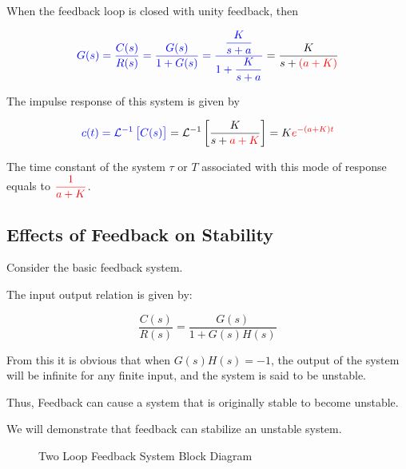 \documentclass[
  14pt,
  a4paper,
  oneside,
  open=any,
  a4paper,
  14pt]{report}
\begin{document}
When the feedback loop is closed with unity feedback, then

\[
    \textcolor{blue}{G(s) = \dfrac{C(s)}{R(s)} = \dfrac{G(s)}{1+G(s)} = \dfrac{\dfrac{K}{s+a}}{1+\dfrac{K}{s+a}}} = \dfrac{K}{s+\textcolor{red}{(a+K)}}
\]

The impulse response of this system is given by

\[  
    \textcolor{blue}{c(t) = \mathcal{L}^{-1}\left[C(s)\right]} = \mathcal{L}^{-1}\left[\dfrac{K}{s+\textcolor{red}{a + K}}\right] = K\textcolor{red}{e^{-(a+K)t}}
\]

The time constant of the system \(\tau\) or \(T\) associated with this
mode of response equals to \(\textcolor{red}{\dfrac{1}{a+K}}\).

\subsection{Effects of Feedback on
Stability}\label{effects-of-feedback-on-stability}

Consider the basic feedback system.

The input output relation is given by:

\[
    \dfrac{C(s)}{R(s)} = \dfrac{G(s)}{1+G(s)H(s)}
\]

From this it is obvious that when \(G(s)H(s) = -1\), the output of the
system will be infinite for any finite input, and the system is said to
be unstable.

Thus, Feedback can cause a system that is originally stable to become
unstable.

We will demonstrate that feedback can stabilize an unstable system.

\begin{figure}[H]


\caption{\label{fig-feedback-diagram-2}Two Loop Feedback System Block
Diagram}

\end{figure}%
\end{document}
